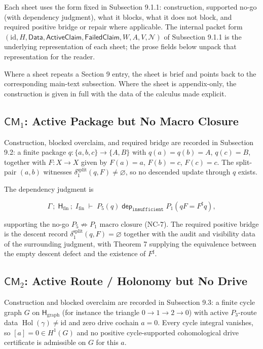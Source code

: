 \documentclass[11pt]{article}
\theoremstyle{definition}
\begin{document}
Each sheet uses the form fixed in Subsection 9.1.1: construction, supported no-go (with dependency judgment), what it blocks, what it does not block, and required positive bridge or repair where applicable. The internal packet form \((\mathrm{id},H,\mathsf{Data},\mathsf{ActiveClaim},\mathsf{FailedClaim},W,A,V,\mathcal N)\) of Subsection 9.1.1 is the underlying representation of each sheet; the prose fields below unpack that representation for the reader.

Where a sheet repeats a Section 9 entry, the sheet is brief and points back to the corresponding main-text subsection. Where the sheet is appendix-only, the construction is given in full with the data of the calculus made explicit.

\subsection{\texorpdfstring{\(\mathsf{CM}_1\): Active Package but No Macro Closure}{C.2 \textbackslash mathsf\{CM\}\_1: Active Package but No Macro Closure}}

Construction, blocked overclaim, and required bridge are recorded in Subsection 9.2: a finite package \(q:\{a,b,c\}\to\{A,B\}\) with \(q(a)=q(b)=A\), \(q(c)=B\), together with \(F:X\to X\) given by \(F(a)=a\), \(F(b)=c\), \(F(c)=c\). The split-pair \((a,b)\) witnesses \(\delta_1^{\mathrm{split}}(q,F)\neq\varnothing\), so no descended update through \(q\) exists.

The dependency judgment is

\[
\Gamma\,;\;\mathsf H_{\mathrm{fin}}\,;\;I_{\mathrm{fin}}\;\vdash\;P_5(q)\;\mathrel{\mathsf{dep}_{\texttt{insufficient}}}\;P_1(qF=F^\sharp q),
\]

supporting the no-go \(P_5\not\Rightarrow P_1\text{ macro closure}\) (NC-7). The required positive bridge is the descent record \(\delta_1^{\mathrm{split}}(q,F)=\varnothing\) together with the audit and visibility data of the surrounding judgment, with Theorem 7 supplying the equivalence between the empty descent defect and the existence of \(F^\sharp\).

\subsection{\texorpdfstring{\(\mathsf{CM}_2\): Active Route / Holonomy but No Drive}{C.3 \textbackslash mathsf\{CM\}\_2: Active Route / Holonomy but No Drive}}

Construction and blocked overclaim are recorded in Subsection 9.3: a finite cycle graph \(G\) on \(\mathsf H_{\mathrm{graph}}\) (for instance the triangle \(0\to 1\to 2\to 0\)) with active \(P_3\)-route data \(\operatorname{Hol}(\gamma)\neq\mathrm{id}\) and zero drive cochain \(a=0\). Every cycle integral vanishes, so \([a]=0\in H^1(G)\) and no positive cycle-supported cohomological drive certificate is admissible on \(G\) for this \(a\).
\end{document}
